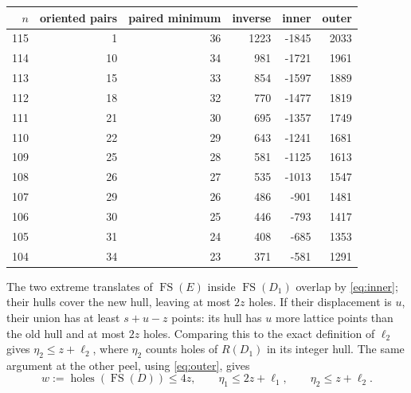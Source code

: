 \documentclass[11pt,a4paper]{article}
\newcommand{\FS}{\operatorname{FS}}
\begin{document}
\begin{center}\small
\begin{tabular}{rrrrrr}
\toprule
$n$ & oriented pairs & paired minimum & inverse & inner & outer\\\midrule
115 & 1 & 36 & 1223 & -1845 & 2033\\
114 & 10 & 34 & 981 & -1721 & 1961\\
113 & 15 & 33 & 854 & -1597 & 1889\\
112 & 18 & 32 & 770 & -1477 & 1819\\
111 & 21 & 30 & 695 & -1357 & 1749\\
110 & 22 & 29 & 643 & -1241 & 1681\\
109 & 25 & 28 & 581 & -1125 & 1613\\
108 & 26 & 27 & 535 & -1013 & 1547\\
107 & 29 & 26 & 486 & -901 & 1481\\
106 & 30 & 25 & 446 & -793 & 1417\\
105 & 31 & 24 & 408 & -685 & 1353\\
104 & 34 & 23 & 371 & -581 & 1291\\
\bottomrule
\end{tabular}
\end{center}


The two extreme translates of $\FS(E)$ inside $\FS(D_1)$ overlap by
\eqref{eq:inner}; their hulls cover the new hull, leaving at most $2z$
holes. If their displacement is $u$, their union has at least $s+u-z$
points: its hull has $u$ more lattice points than the old hull and at most
$2z$ holes. Comparing this to the exact definition of $\ell_2$ gives
$\eta_2\le z+\ell_2$, where $\eta_2$ counts holes of $R(D_1)$ in
its integer hull. The same argument at the other peel, using
\eqref{eq:outer}, gives
\begin{equation}\label{eq:propagation}
 w:=\operatorname{holes}(\FS(D))\le4z,\qquad
 \eta_1\le2z+\ell_1,\qquad\eta_2\le z+\ell_2.
\end{equation}
\end{document}

